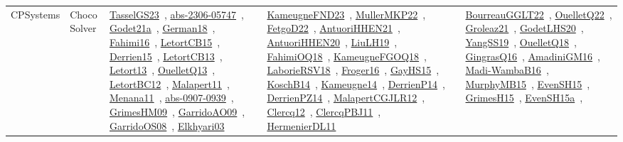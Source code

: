 {\begin{longtable}{lp{3cm}>{\raggedright\arraybackslash}p{6cm}>{\raggedright\arraybackslash}p{6cm}>{\raggedright\arraybackslash}p{8cm}}
CPSystems & Choco Solver & \href{../works/TasselGS23.pdf}{TasselGS23}~\cite{TasselGS23}, \href{../works/abs-2306-05747.pdf}{abs-2306-05747}~\cite{abs-2306-05747}, \href{../works/Godet21a.pdf}{Godet21a}~\cite{Godet21a}, \href{../works/German18.pdf}{German18}~\cite{German18}, \href{../works/Fahimi16.pdf}{Fahimi16}~\cite{Fahimi16}, \href{../works/LetortCB15.pdf}{LetortCB15}~\cite{LetortCB15}, \href{../works/Derrien15.pdf}{Derrien15}~\cite{Derrien15}, \href{../works/LetortCB13.pdf}{LetortCB13}~\cite{LetortCB13}, \href{../works/Letort13.pdf}{Letort13}~\cite{Letort13}, \href{../works/OuelletQ13.pdf}{OuelletQ13}~\cite{OuelletQ13}, \href{../works/LetortBC12.pdf}{LetortBC12}~\cite{LetortBC12}, \href{../works/Malapert11.pdf}{Malapert11}~\cite{Malapert11}, \href{../works/Menana11.pdf}{Menana11}~\cite{Menana11}, \href{../works/abs-0907-0939.pdf}{abs-0907-0939}~\cite{abs-0907-0939}, \href{../works/GrimesHM09.pdf}{GrimesHM09}~\cite{GrimesHM09}, \href{../works/GarridoAO09.pdf}{GarridoAO09}~\cite{GarridoAO09}, \href{../works/GarridoOS08.pdf}{GarridoOS08}~\cite{GarridoOS08}, \href{../works/Elkhyari03.pdf}{Elkhyari03}~\cite{Elkhyari03} & \href{../works/KameugneFND23.pdf}{KameugneFND23}~\cite{KameugneFND23}, \href{../works/MullerMKP22.pdf}{MullerMKP22}~\cite{MullerMKP22}, \href{../works/FetgoD22.pdf}{FetgoD22}~\cite{FetgoD22}, \href{../works/AntuoriHHEN21.pdf}{AntuoriHHEN21}~\cite{AntuoriHHEN21}, \href{../works/AntuoriHHEN20.pdf}{AntuoriHHEN20}~\cite{AntuoriHHEN20}, \href{../works/LiuLH19.pdf}{LiuLH19}~\cite{LiuLH19}, \href{../works/FahimiOQ18.pdf}{FahimiOQ18}~\cite{FahimiOQ18}, \href{../works/KameugneFGOQ18.pdf}{KameugneFGOQ18}~\cite{KameugneFGOQ18}, \href{../works/LaborieRSV18.pdf}{LaborieRSV18}~\cite{LaborieRSV18}, \href{../works/Froger16.pdf}{Froger16}~\cite{Froger16}, \href{../works/GayHS15.pdf}{GayHS15}~\cite{GayHS15}, \href{../works/KoschB14.pdf}{KoschB14}~\cite{KoschB14}, \href{../works/Kameugne14.pdf}{Kameugne14}~\cite{Kameugne14}, \href{../works/DerrienP14.pdf}{DerrienP14}~\cite{DerrienP14}, \href{../works/DerrienPZ14.pdf}{DerrienPZ14}~\cite{DerrienPZ14}, \href{../works/MalapertCGJLR12.pdf}{MalapertCGJLR12}~\cite{MalapertCGJLR12}, \href{../works/Clercq12.pdf}{Clercq12}~\cite{Clercq12}, \href{../works/ClercqPBJ11.pdf}{ClercqPBJ11}~\cite{ClercqPBJ11}, \href{../works/HermenierDL11.pdf}{HermenierDL11}~\cite{HermenierDL11} & \href{../works/BourreauGGLT22.pdf}{BourreauGGLT22}~\cite{BourreauGGLT22}, \href{../works/OuelletQ22.pdf}{OuelletQ22}~\cite{OuelletQ22}, \href{../works/Groleaz21.pdf}{Groleaz21}~\cite{Groleaz21}, \href{../works/GodetLHS20.pdf}{GodetLHS20}~\cite{GodetLHS20}, \href{../works/YangSS19.pdf}{YangSS19}~\cite{YangSS19}, \href{../works/OuelletQ18.pdf}{OuelletQ18}~\cite{OuelletQ18}, \href{../works/GingrasQ16.pdf}{GingrasQ16}~\cite{GingrasQ16}, \href{../works/AmadiniGM16.pdf}{AmadiniGM16}~\cite{AmadiniGM16}, \href{../works/Madi-WambaB16.pdf}{Madi-WambaB16}~\cite{Madi-WambaB16}, \href{../works/MurphyMB15.pdf}{MurphyMB15}~\cite{MurphyMB15}, \href{../works/EvenSH15.pdf}{EvenSH15}~\cite{EvenSH15}, \href{../works/GrimesH15.pdf}{GrimesH15}~\cite{GrimesH15}, \href{../works/EvenSH15a.pdf}{EvenSH15a}~\cite{EvenSH15a}, 
\end{longtable}}
